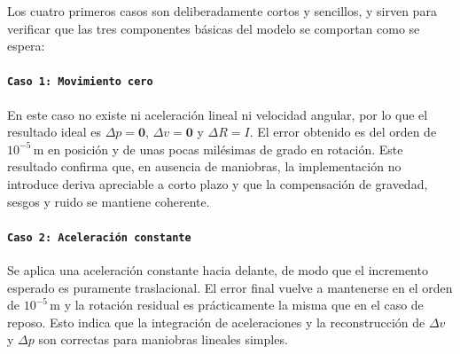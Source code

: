 \begin{table}[H]
    \centering
    \caption{Resumen de resultados del ensayo sint\'etico de preintegraci\'on IMU.}
    \label{tab:test2_preintegration_summary}
    \small
\end{table}


Los cuatro primeros casos son deliberadamente cortos y sencillos, y sirven para verificar que las tres componentes 
b\'asicas del modelo se comportan como se espera:

\paragraph{\texttt{Caso 1: Movimiento cero}}
En este caso no existe ni aceleraci\'on lineal ni velocidad angular, por lo que el resultado ideal es 
$\Delta p=\mathbf{0}$, $\Delta v=\mathbf{0}$ y $\Delta R=I$. El error obtenido es del orden de $10^{-5}\,\mathrm{m}$ en 
posici\'on y de unas pocas mil\'esimas de grado en rotaci\'on. Este resultado confirma que, en ausencia de maniobras, la 
implementaci\'on no introduce deriva apreciable a corto plazo y que la compensaci\'on de gravedad, sesgos y ruido se 
mantiene coherente.

\paragraph{\texttt{Caso 2: Aceleraci\'on constante}}
Se aplica una aceleraci\'on constante hacia delante, de modo que el incremento esperado es puramente traslacional. 
El error final vuelve a mantenerse en el orden de $10^{-5}\,\mathrm{m}$ y la rotaci\'on residual es pr\'acticamente 
la misma que en el caso de reposo. Esto indica que la integraci\'on de aceleraciones y la reconstrucci\'on de $\Delta v$ y 
$\Delta p$ son correctas para maniobras lineales simples.

